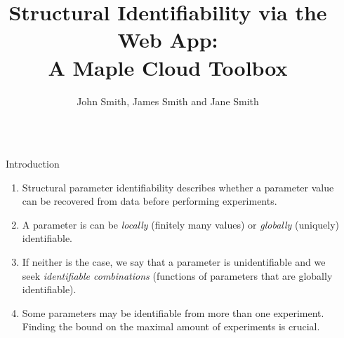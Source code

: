 \documentclass[final,hyperref={pdfpagelabels=false}]{beamer}
\title{\huge Structural Identifiability via the Web App:\\A Maple Cloud Toolbox} %
\author{John Smith, James Smith and Jane Smith} %
\institute{Department and University Name} %
\begin{document}

\begin{frame}[t] %

    \begin{columns}[t] %

        \begin{column}{.02\textwidth}\end{column} %

        \begin{column}{.465\textwidth} %


            \begin{block}{Introduction}

                \begin{enumerate}
                    \item Structural parameter identifiability describes whether a parameter value can be recovered from data before performing experiments.
                    \item A parameter is can be \emph{locally} (finitely many values) or \emph{globally} (uniquely) identifiable.
                    \item If neither is the case, we say that a parameter is unidentifiable and we seek \emph{identifiable combinations} (functions of parameters that are globally identifiable).
                    \item Some parameters may be identifiable from more than one experiment. Finding the bound on the maximal amount of experiments is crucial.
                \end{enumerate}

            \end{block}



\end{column}
\end{columns}
\end{frame}
\end{document}
